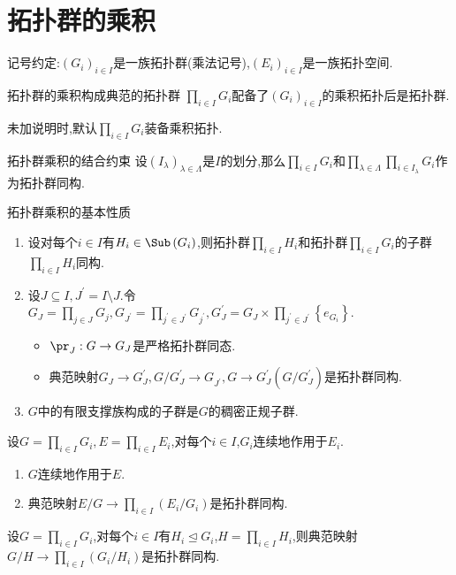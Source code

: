 \section{拓扑群的乘积}

记号约定:$\left(G_{i}\right)_{i\in I}$是一族拓扑群(乘法记号),$\left(E_{i}\right)_{i\in I}$是一族拓扑空间.

\begin{proposition}{拓扑群的乘积构成典范的拓扑群}{}
	$\prod\limits_{i\in I}G_{i}$配备了$\left(G_{i}\right)_{i\in I}$的乘积拓扑后是拓扑群.
\end{proposition}

\begin{convention}{}{}
	未加说明时,默认$\prod\limits_{i\in I}G_{i}$装备乘积拓扑.
\end{convention}

\begin{proposition}{拓扑群乘积的结合约束}{}
	设$\left(I_{\lambda}\right)_{\lambda\in\Lambda}$是$I$的划分,那么$\prod\limits_{i\in I}G_{i}$和$\prod\limits_{\lambda\in\Lambda}\prod\limits_{i\in I_{\lambda}}G_{i}$作为拓扑群同构.
\end{proposition}

\begin{proposition}{拓扑群乘积的基本性质}{}
	\begin{enumerate}
		\item 设对每个$i\in I$有$H_{i}\in\Sub\left(G_{i}\right)$,则拓扑群$\prod\limits_{i\in I}H_{i}$和拓扑群$\prod\limits_{i\in I}G_{i}$的子群$\prod\limits_{i\in I}H_{i}$同构.
		\item 设$J\subseteq I,J^{\prime}=I\setminus J$.令$G_{J}=\prod\limits_{j\in J}G_{j},G_{J^{\prime}}=\prod\limits_{j^{\prime}\in J^{\prime}}G_{j^{\prime}},G_{J}^{\prime}=G_{J}\times\prod\limits_{j^{\prime}\in J^{\prime}}\left\{e_{G_{i}}\right\}$.
		\begin{itemize}
			\item $\pr_{J}:G\to G_{J}$是严格拓扑群同态.
			\item 典范映射$G_{J}\to G_{J}^{\prime},G/G_{J}^{\prime}\to G_{J^{\prime}},G\to G_{J}^{\prime}\left(G/G_{J}^{\prime}\right)$是拓扑群同构.
		\end{itemize}
		\item $G$中的有限支撑族构成的子群是$G$的稠密正规子群.
	\end{enumerate}
\end{proposition}

\begin{proposition}{}{}
	设$G=\prod\limits_{i\in I}G_{i},E=\prod\limits_{i\in I}E_{i}$,对每个$i\in I$,$G_{i}$连续地作用于$E_{i}$.
	\begin{enumerate}
		\item $G$连续地作用于$E$.
		\item 典范映射$E/G\to\prod\limits_{i\in I}\left(E_{i}/G_{i}\right)$是拓扑群同构.
	\end{enumerate}
\end{proposition}

\begin{proposition}{}{}
	设$G=\prod\limits_{i\in I}G_{i}$,对每个$i\in I$有$H_{i}\unlhd G_{i}$,$H=\prod\limits_{i\in I}H_{i}$,则典范映射$G/H\to\prod\limits_{i\in I}\left(G_{i}/H_{i}\right)$是拓扑群同构.
\end{proposition}